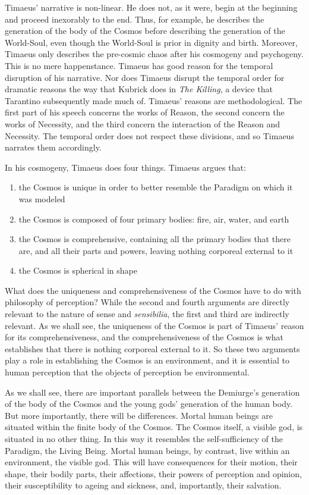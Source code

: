 Timaeus' narrative is non-linear. He does not, as it were, begin at the beginning and proceed inexorably to the end. Thus, for example, he describes the generation of the body of the Cosmos before describing the generation of the World-Soul, even though the World-Soul is prior in dignity and birth. Moreover, Timaeus only describes the pre-cosmic chaos after his cosmogeny and psychogeny. This is no mere happenstance. Timaeus has good reason for the temporal disruption of his narrative. Nor does Timaeus disrupt the temporal order for dramatic reasons the way that Kubrick does in \emph{The Killing}, a device that Tarantino subsequently made much of. Timaeus' reasons are methodological. The first part of his speech concerns the works of Reason, the second concern the works of Necessity, and the third concern the interaction of the Reason and Necessity. The temporal order does not respect these divisions, and so Timaeus narrates them accordingly.

In his cosmogeny, Timaeus does four things. Timaeus argues that:
\begin{enumerate}[(1)]
	\item the Cosmos is unique in order to better resemble the Paradigm on which it was modeled
	\item the Cosmos is composed of four primary bodies: fire, air, water, and earth
	\item the Cosmos is comprehensive, containing all the primary bodies that there are, and all their parts and powers, leaving nothing corporeal external to it
	\item the Cosmos is spherical in shape
\end{enumerate}
What does the uniqueness and comprehensiveness of the Cosmos have to do with philosophy of perception? While the second and fourth arguments are directly relevant to the nature of sense and \emph{sensibilia}, the first and third are indirectly relevant. As we shall see, the uniqueness of the Cosmos is part of Timaeus' reason for its comprehensiveness, and the comprehensiveness of the Cosmos is what establishes that there is nothing corporeal external to it. So these two arguments play a role in establishing the Cosmos is an environment, and it is essential to human perception that the objects of perception be environmental.

As we shall see, there are important parallels between the Demiurge's generation of the body of the Cosmos and the young gods' generation of the human body. But more importantly, there will be differences. Mortal human beings are situated within the finite body of the Cosmos. The Cosmos itself, a visible god, is situated in no other thing. In this way it resembles the self-sufficiency of the Paradigm, the Living Being. Mortal human beings, by contrast, live within an environment, the visible god. This will have consequences for their motion, their shape, their bodily parts, their affections, their powers of perception and opinion, their susceptibility to ageing and sickness, and, importantly, their salvation.

